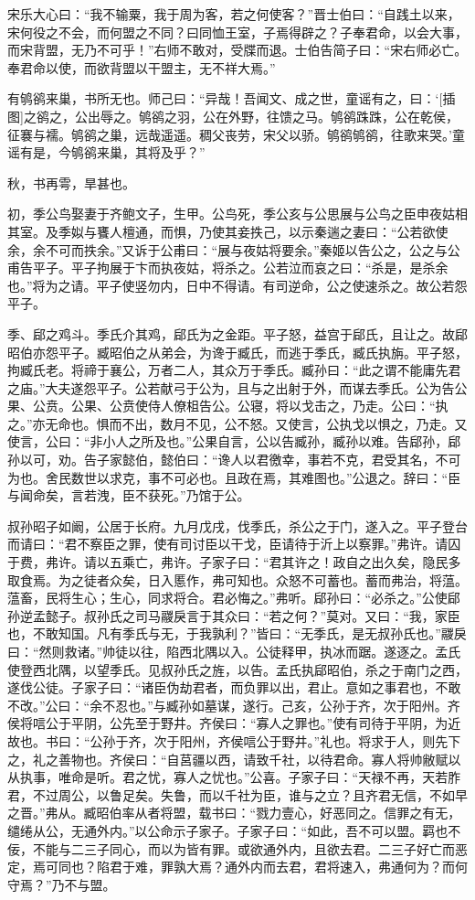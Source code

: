 \documentclass[a4paper,12pt,UTF8,twoside]{ctexbook}
\begin{document}
宋乐大心曰：“我不输粟，我于周为客，若之何使客？”晋士伯曰：“自践土以来，宋何役之不会，而何盟之不同？曰同恤王室，子焉得辟之？子奉君命，以会大事，而宋背盟，无乃不可乎！”右师不敢对，受牒而退。士伯告简子曰：“宋右师必亡。奉君命以使，而欲背盟以干盟主，无不祥大焉。”

有鸲鹆来巢，书所无也。师己曰：“异哉！吾闻文、成之世，童谣有之，曰：‘[插图]之鹆之，公出辱之。鸲鹆之羽，公在外野，往馈之马。鸲鹆跦跦，公在乾侯，征褰与襦。鸲鹆之巢，远哉遥遥。稠父丧劳，宋父以骄。鸲鹆鸲鹆，往歌来哭。’童谣有是，今鸲鹆来巢，其将及乎？”

秋，书再雩，旱甚也。

初，季公鸟娶妻于齐鲍文子，生甲。公鸟死，季公亥与公思展与公鸟之臣申夜姑相其室。及季姒与饔人檀通，而惧，乃使其妾抶己，以示秦遄之妻曰：“公若欲使余，余不可而抶余。”又诉于公甫曰：“展与夜姑将要余。”秦姬以告公之，公之与公甫告平子。平子拘展于卞而执夜姑，将杀之。公若泣而哀之曰：“杀是，是杀余也。”将为之请。平子使竖勿内，日中不得请。有司逆命，公之使速杀之。故公若怨平子。

季、郈之鸡斗。季氏介其鸡，郈氏为之金距。平子怒，益宫于郈氏，且让之。故郈昭伯亦怨平子。臧昭伯之从弟会，为谗于臧氏，而逃于季氏，臧氏执旃。平子怒，拘臧氏老。将禘于襄公，万者二人，其众万于季氏。臧孙曰：“此之谓不能庸先君之庙。”大夫遂怨平子。公若献弓于公为，且与之出射于外，而谋去季氏。公为告公果、公贲。公果、公贲使侍人僚柤告公。公寝，将以戈击之，乃走。公曰：“执之。”亦无命也。惧而不出，数月不见，公不怒。又使言，公执戈以惧之，乃走。又使言，公曰：“非小人之所及也。”公果自言，公以告臧孙，臧孙以难。告郈孙，郈孙以可，劝。告子家懿伯，懿伯曰：“谗人以君徼幸，事若不克，君受其名，不可为也。舍民数世以求克，事不可必也。且政在焉，其难图也。”公退之。辞曰：“臣与闻命矣，言若洩，臣不获死。”乃馆于公。

叔孙昭子如阚，公居于长府。九月戊戌，伐季氏，杀公之于门，遂入之。平子登台而请曰：“君不察臣之罪，使有司讨臣以干戈，臣请待于沂上以察罪。”弗许。请囚于费，弗许。请以五乘亡，弗许。子家子曰：“君其许之！政自之出久矣，隐民多取食焉。为之徒者众矣，日入慝作，弗可知也。众怒不可蓄也。蓄而弗治，将蕰。蕰畜，民将生心；生心，同求将合。君必悔之。”弗听。郈孙曰：“必杀之。”公使郈孙逆孟懿子。叔孙氏之司马鬷戾言于其众曰：“若之何？”莫对。又曰：“我，家臣也，不敢知国。凡有季氏与无，于我孰利？”皆曰：“无季氏，是无叔孙氏也。”鬷戾曰：“然则救诸。”帅徒以往，陷西北隅以入。公徒释甲，执冰而踞。遂逐之。孟氏使登西北隅，以望季氏。见叔孙氏之旌，以告。孟氏执郈昭伯，杀之于南门之西，遂伐公徒。子家子曰：“诸臣伪劫君者，而负罪以出，君止。意如之事君也，不敢不改。”公曰：“余不忍也。”与臧孙如墓谋，遂行。己亥，公孙于齐，次于阳州。齐侯将唁公于平阴，公先至于野井。齐侯曰：“寡人之罪也。”使有司待于平阴，为近故也。书曰：“公孙于齐，次于阳州，齐侯唁公于野井。”礼也。将求于人，则先下之，礼之善物也。齐侯曰：“自莒疆以西，请致千社，以待君命。寡人将帅敝赋以从执事，唯命是听。君之忧，寡人之忧也。”公喜。子家子曰：“天禄不再，天若胙君，不过周公，以鲁足矣。失鲁，而以千社为臣，谁与之立？且齐君无信，不如早之晋。”弗从。臧昭伯率从者将盟，载书曰：“戮力壹心，好恶同之。信罪之有无，缱绻从公，无通外内。”以公命示子家子。子家子曰：“如此，吾不可以盟。羁也不佞，不能与二三子同心，而以为皆有罪。或欲通外内，且欲去君。二三子好亡而恶定，焉可同也？陷君于难，罪孰大焉？通外内而去君，君将速入，弗通何为？而何守焉？”乃不与盟。
\end{document}
